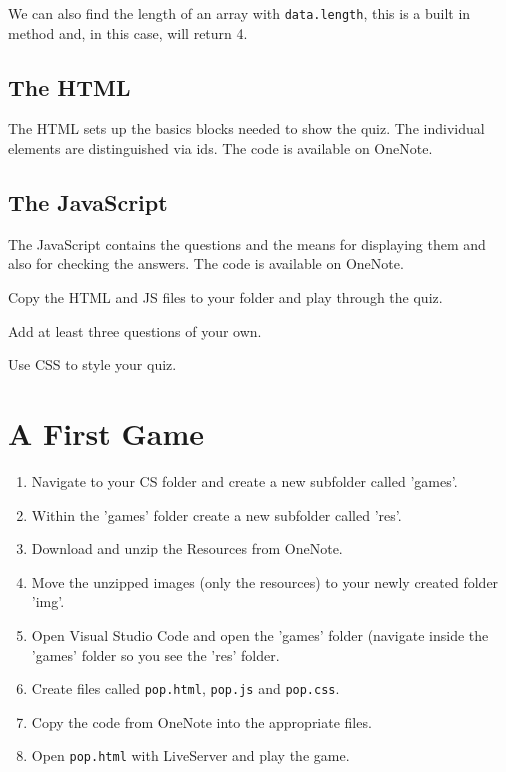 \documentclass[english,11pt,a4paper]{report}
\begin{document}
We can also find the length of an array with \verb|data.length|, this is a built in method and, in this case, will return 4.

\subsection{The HTML}
The HTML sets up the basics blocks needed to show the quiz. The individual elements are distinguished via ids. The code is available on OneNote.

\subsection{The JavaScript}
The JavaScript contains the questions and the means for displaying them and also for checking the answers. The code is available on OneNote.


\begin{ex}
Copy the HTML and JS files to your folder and play through the quiz.
\end{ex}

\begin{ex}
Add at least three questions of your own.
\end{ex}

\begin{ex}
Use CSS to style your quiz.
\end{ex}

\newpage

\section{A First Game}

\begin{ex}
\begin{enumerate}
\item Navigate to your CS folder and create a new subfolder called 'games'.
\item Within the 'games' folder create a new subfolder called 'res'.
\item Download and unzip the Resources from OneNote.
\item Move the unzipped images (only the resources) to your newly created folder 'img'.
\item Open Visual Studio Code and open the 'games' folder (navigate inside the 'games' folder so you see the 'res' folder.
\item Create files called \verb|pop.html|, \verb|pop.js| and \verb|pop.css|.
\item Copy the code from OneNote into the appropriate files. 
\item Open \verb|pop.html| with LiveServer and play the game.
\end{enumerate}
\end{ex}
\end{document}
